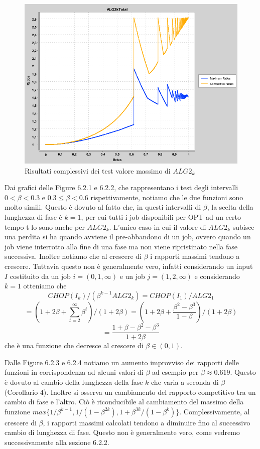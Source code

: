 \documentclass[twoside,openany,titlepage,fleqn,
	headinclude,12pt,a4paper,BCOR5mm,footinclude]{scrbook}
\begin{document}
\begin{figure}[H]
\caption[Unione test valore massimo $ALG2_{K}$]{Risultati complessivi dei test valore massimo di $ALG2_{k}$}
\centering
\includegraphics[scale=0.4]{max/ALG2kTotal.png}
\end{figure}
Dai grafici delle Figure 6.2.1 e 6.2.2, che rappresentano i test degli intervalli $0<\beta <0.3$ e $0.3 \leq \beta < 0.6$ rispettivamente, notiamo che le due funzioni sono molto simili. Questo è dovuto al fatto che, in questi intervalli di $\beta$, la scelta della lunghezza di fase è $k=1$, per cui tutti i job disponibili per OPT ad un certo tempo t lo sono anche per $ALG2_{k}$. L'unico caso in cui il valore di $ALG2_{k}$ subisce una perdita si ha quando avviene il pre-abbandono di un job, ovvero quando un job viene interrotto alla fine di una fase ma non viene ripristinato nella fase successiva. Inoltre notiamo che al crescere di $\beta$ i rapporti massimi tendono a crescere. Tuttavia questo non è generalmente vero, infatti considerando un input $I$ costituito da un job $i = (0,1,\infty)$ e un job $j = (1,2,\infty)$ e considerando $k = 1$ otteniamo che $$CHOP(I_{k})/(\beta^{k-1}ALG2_{k}) = CHOP(I_{1})/ALG2_{1}$$ $$= (1 + 2\beta + \sum_{t = 2}^{\infty}\beta^{t}) / (1 + 2\beta) = (1 + 2\beta + \frac{\beta^{2} - \beta^{3}}{1 - \beta}) / (1 + 2\beta)$$
$$= \frac{1 + \beta - \beta^{2} - \beta^{3}}{1 + 2\beta}$$ \newline
che è una funzione che decresce al crescere di $\beta \in (0, 1)$.

Dalle Figure 6.2.3 e 6.2.4 notiamo un aumento improvviso dei rapporti delle funzioni in corrispondenza ad alcuni valori di $\beta$ ad esempio per $\beta \approx 0.619$. Questo è dovuto al cambio della lunghezza della fase $k$ che varia a seconda di $\beta$ (Corollario 4). Inoltre si osserva un cambiamento del rapporto competitivo tra un cambio di fase e l'altro. Ciò è riconducibile al cambiamento del massimo della funzione $max \{1 / \beta^{k - 1}, 1 / (1 - \beta^{2k}), 1 + \beta^{3k} / (1 - \beta^{k})\}$. Complessivamente, al crescere di $\beta$, i rapporti massimi calcolati tendono a diminuire fino al successivo cambio di lunghezza di fase. Questo non è generalmente vero, come vedremo successivamente alla sezione 6.2.2.
\end{document}
